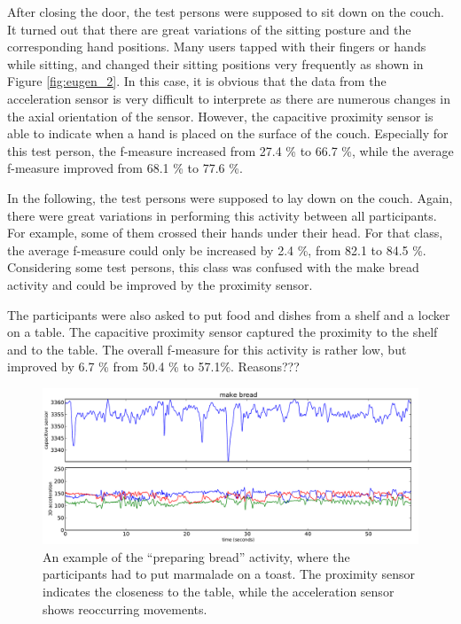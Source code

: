 \documentclass[runningheads,a4paper]{llncs}
\begin{document}
After closing the door, the test persons were supposed to sit down on the couch. It turned out that there are great variations of the sitting posture and the corresponding hand positions. Many users tapped with their fingers or hands while sitting, and changed their sitting positions very frequently as shown in Figure \ref{fig:eugen_2}. In this case, it is obvious that the data from the acceleration sensor is very difficult to interprete as there are numerous changes in the axial orientation of the sensor. However, the capacitive proximity sensor is able to indicate when a hand is placed on the surface of the couch. Especially for this test person, the f-measure increased from 27.4 \% to 66.7 \%, while the average f-measure improved from 68.1 \% to 77.6 \%. 

In the following, the test persons were supposed to lay down on the couch. Again, there were great variations in performing this activity between all participants. For example, some of them crossed their hands under their head. For that class, the average f-measure could only be increased by 2.4 \%, from 82.1 to 84.5 \%. Considering some test persons, this class was confused with the make bread activity and could be improved by the proximity sensor. 

The participants were also asked to put food and dishes from a shelf and a locker on a table. The capacitive proximity sensor captured the proximity to the shelf and to the table. The overall f-measure for this activity is rather low, but improved by 6.7 \% from 50.4 \% to 57.1\%. Reasons???

\begin{figure}[htpb]
	\centering
		\includegraphics[width=\textwidth]{../Auswertung/images/eugen_5.pdf}
	\caption{An example of the ``preparing bread'' activity, where the participants had to put marmalade on a toast. The proximity sensor indicates the closeness to the table, while the acceleration sensor shows reoccurring movements.}
	\label{fig:eugen_5}
\end{figure}
\end{document}
